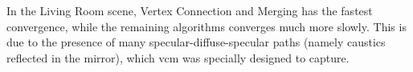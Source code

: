 In the Living Room scene, Vertex Connection and Merging has the fastest convergence, while the remaining algorithms converges much more slowly. This is due to the presence of many specular-diffuse-specular paths (namely caustics reflected in the mirror), which \gls{vcm} was specially designed to capture.


